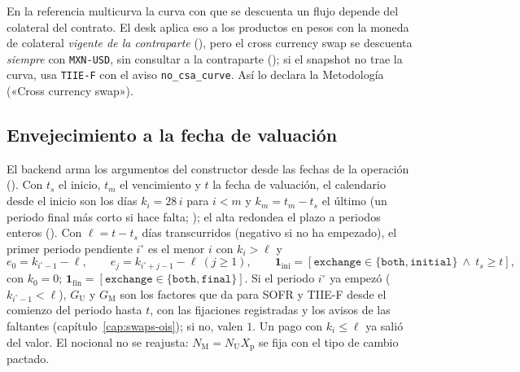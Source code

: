 \begin{diferencia}
  En la referencia multicurva \citep{fujii2009} la curva con que se descuenta un flujo depende del colateral
  del contrato. El desk aplica eso a los productos en pesos con la moneda de colateral \emph{vigente de la
  contraparte} (), pero el cross currency swap se descuenta
  \emph{siempre} con \texttt{MXN-USD}, sin consultar a la contraparte
  (); si el snapshot no trae la curva, usa \texttt{TIIE-F} con el aviso
  \texttt{no\_csa\_curve}. Así lo declara la Metodología («Cross currency swap»).
\end{diferencia}

\subsection{Envejecimiento a la fecha de valuación}\label{sec:cap07-envejecimiento}

El backend arma los argumentos del constructor desde las fechas de la operación
(). Con $t_s$ el inicio, $t_m$ el vencimiento y $t$ la fecha de
valuación, el calendario desde el inicio son los días $k_i=28\,i$ para $i<m$ y $k_m=t_m-t_s$ el último (un
periodo final más corto si hace falta; ); el alta
redondea el plazo a periodos enteros (). Con
$\ell=t-t_s$ días transcurridos (negativo si no ha empezado), el primer periodo pendiente $i^{\circ}$ es el
menor $i$ con $k_i>\ell$ y
\begin{equation}\label{eq:cap07-aging}
  e_0=k_{i^{\circ}-1}-\ell,\qquad e_j=k_{i^{\circ}+j-1}-\ell\ (j\ge1),\qquad
  \mathbf 1_{\mathrm{ini}}=[\texttt{exchange}\in\{\texttt{both},\texttt{initial}\}\ \wedge\ t_s\ge t],
\end{equation}
con $k_0=0$; $\mathbf 1_{\mathrm{fin}}=[\texttt{exchange}\in\{\texttt{both},\texttt{final}\}]$. Si el periodo
$i^{\circ}$ ya empezó ($k_{i^{\circ}-1}<\ell$), $G_{\mathrm U}$ y $G_{\mathrm M}$ son los factores que da
 para SOFR y TIIE-F desde el comienzo del periodo hasta $t$, con
las fijaciones registradas y los avisos de las faltantes (capítulo~\ref{cap:swaps-ois}); si no, valen $1$. Un
pago con $k_i\le\ell$ ya salió del valor. El nocional no se reajusta: $N_{\mathrm M}=N_{\mathrm U}X_{\mathrm p}$ se
fija con el tipo de cambio pactado.

